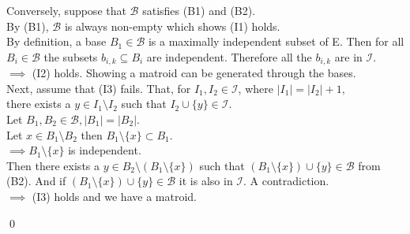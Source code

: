 \documentclass[../main.tex]{subfiles}
\begin{document}
\vspace{4mm}

\noindent Conversely, suppose that $\mathcal{B}$ satisfies (B1) and (B2).\\
\noindent By (B1), $\mathcal{B}$ is always non-empty which shows (I1) holds.
\\
\noindent By definition, a base $B_1 \in \mathcal{B}$ is a maximally independent subset of E. Then for all $B_i \in \mathcal{B}$ the subsets $b_{i,k} \subseteq B_i$  are independent. Therefore all the $b_{i,k}$ are in $\mathcal{I}.$\\ \noindent $\implies$ (I2) holds. Showing a matroid can be generated through the bases.
\\
\noindent Next, assume that (I3) fails. That, for $I_1, I_2 \in \mathcal{I}$, where $|I_1| = |I_2|+1,$\\ \noindent there exists a  $y \in I_1 \setminus I_2$ such that $I_2 \cup \{y\} \in \mathcal{I}.$\\
\noindent Let $B_1, B_2 \in \mathcal{B}, |B_1| = |B_2|.$\\
\noindent Let $x \in B_1 \setminus B_2$ then $B_1 \setminus \{x\} \subset B_1.$ \\ \noindent $\implies B_1 \setminus \{x\}$ is independent.\\
\noindent Then there exists a $y \in B_2 \setminus (B_1 \setminus \{x\})$ such that $(B_1 \setminus \{x\}) \cup \{y\} \in \mathcal{B}$ from (B2). And if $(B_1 \setminus \{x\}) \cup \{y\} \in \mathcal{B}$ it is also in $\mathcal{I}$. A contradiction.\\ \noindent $\implies$ (I3) holds and we have a matroid.

\qed
\end{document}
